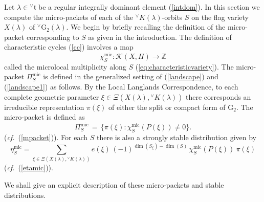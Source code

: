\documentclass[a4paper, 11pt]{article}
\newcommand{\R}{\mathbb{R}}
\begin{document}
Let $\lambda\in {}^\vee\mathfrak{t}$ be a regular integrally dominant
element (\ref{intdom}).   In this section we compute the micro-packets
of  each of the
${}^{\vee}K(\lambda)$-orbits $S$ on the flag variety $X(\lambda)$ 
of ${}^{\vee}\mathrm{G}_{2}(\lambda)$. 
We begin by briefly recalling the definition of the micro-packet corresponding
to $S$ as given in the introduction. The definition of characteristic
cycles (\ref{cc}) involves a map 
$$\chi_{S}^{\mathrm{mic}}:\mathscr{K}(X,H)\rightarrow \mathbb{Z}$$
called the microlocal multiplicity along $S$
(\ref{eq:characteristicvariety}). 
The micro-packet $\Pi_S^{\mathrm{mic}}$ is defined in the generalized setting of
(\ref{landscape}) and (\ref{landscape1}) as follows. By the
Local Langlands Correspondence, to each
complete geometric parameter $\xi \in \Xi(X(\lambda),
{}^{\vee}K(\lambda))$ there corresponds an irreducible representation
$\pi(\xi)$ of either the split or compact form of $\mathrm{G}_{2}$. The 
 micro-packet is defined as 
\begin{equation}\label{eq:DefMicroPacket}
\Pi_{S}^{\mathrm{mic}}\, =\, \{\pi(\xi):\chi_{S}^{\mathrm{mic}}(P(\xi))\neq 0\}.
\end{equation}
(\emph{cf.}~(\ref{mpacket})).
For each $S$ there is also a strongly stable distribution given by
$$
\eta_S^{\mathrm{mic}}=\sum_{\xi\in \Xi(X(\lambda),{}^{\vee}K(\lambda))}
e(\xi) \, (-1)^{\dim(S_\xi)-\dim(S)} \, \chi_{S}^{\mathrm{mic}}(P(\xi)) \ \pi(\xi)
$$
(\emph{cf.}~(\ref{etamic})). 

We shall give an explicit description of these micro-packets and stable
distributions. 
\end{document}
